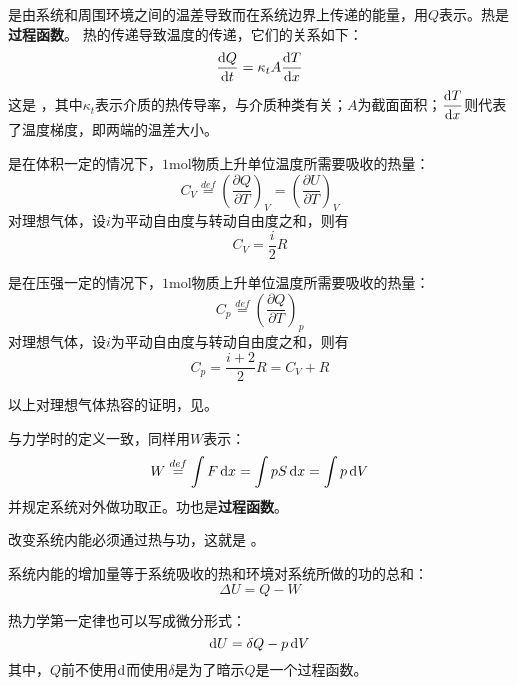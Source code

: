 \begin{Itemize}
    \item {}是由系统和周围环境之间的温差导致而在系统边界上传递的能量，用$Q$表示。热是\textbf{过程函数}。
    热的传递导致温度的传递，它们的关系如下：
    \begin{equation}
        \frac{\dif{Q}}{\dif{t}} = \kappa_{t}A\frac{\dif{T}}{\dif{x}}
    \end{equation}
    这是 ，其中$\kappa_{t}$表示介质的热传导率，与介质种类有关；$A$为截面面积；$\dfrac{\dif{T}}{\dif{x}}$则代表了温度梯度，即两端的温差大小。
    \item {} 是在体积一定的情况下，$1\mathrm{mol}$物质上升单位温度所需要吸收的热量：
    \begin{equation}
        C_{V} \overset{def}{=} \left(\frac{\partial{Q}}{\partial{T}}\right)_{V} = \left(\frac{\partial{U}}{\partial{T}}\right)_{V}
        \nonumber
    \end{equation}
    对理想气体，设$i$为平动自由度与转动自由度之和，则有
    \begin{equation}
        C_{V} = \frac{i}{2}R
        \nonumber
    \end{equation}
    \item {} 是在压强一定的情况下，$1\mathrm{mol}$物质上升单位温度所需要吸收的热量：
    \begin{equation}
        C_{p} \overset{def}{=} \left(\frac{\partial{Q}}{\partial{T}}\right)_{p}
        \nonumber
    \end{equation}
    对理想气体，设$i$为平动自由度与转动自由度之和，则有
    \begin{equation}
        C_{p} = \frac{i+2}{2}R = C_{V}+R
        \nonumber
    \end{equation}

    以上对理想气体热容的证明，见。
    \item {} 与力学时的定义一致，同样用$W$表示：
    \begin{equation}
        W \overset{def}{=} \int F\dif{x} = \int pS\dif{x} = \int p\dif{V}
        \nonumber
    \end{equation}
    并规定系统对外做功取正。功也是\textbf{过程函数}。
\end{Itemize}

改变系统内能必须通过热与功，这就是 。

\begin{law}
    系统内能的增加量等于系统吸收的热和环境对系统所做的功的总和：
    \begin{equation}
        \Delta U = Q - W
        \nonumber
    \end{equation}
\end{law}
热力学第一定律也可以写成微分形式：
\begin{equation}
    \dif{U} = \delta{Q} - p\dif{V}
    \nonumber
\end{equation}
其中，$Q$前不使用$\dif$而使用$\delta$是为了暗示$Q$是一个过程函数。
